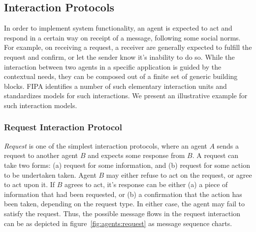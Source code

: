 \subsection{Interaction Protocols}

In order to implement system functionality, an agent is expected to act and respond in a certain way on receipt of a message,
following some social norms. For example, on receiving a request, a receiver are generally expected to fulfill the request and
confirm, or let the sender know it's inability to do so.
%
While the interaction between two agents in a specific application is guided by the contextual needs, they can be composed
out of a finite set of generic building blocks. FIPA identifies a number of such elementary interaction units and standardizes
models for such interactions. We present an illustrative example for such interaction models.

\subsubsection*{Request Interaction Protocol}

{\it Request} is one of the simplest interaction protocols, where an agent $A$ sends a request to another agent $B$ and 
expects some response from $B$. A request can take two forms: (a) request for some information, and (b) request for some action to be 
undertaken taken. Agent $B$ may either refuse to act on the request, or agree to act upon it. If $B$ agrees to act, it's response
can be either (a) a piece of information that had been requested, or (b) a confirmation that the action has been taken, depending
on the request type. In either case, the agent may fail to satisfy the request. Thus, the possible message flows in the request
interaction can be as depicted in figure~\ref{fig:agents:request} as message sequence charts. 

